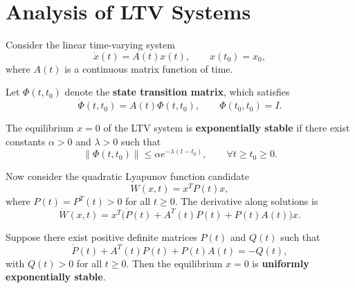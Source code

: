 \section{Analysis of LTV Systems}

Consider the linear time-varying system
\begin{equation}
\dot{x}(t) = A(t)x(t), \qquad x(t_0)=x_0,
\end{equation}
where $A(t)$ is a continuous matrix function of time.

Let $\Phi(t,t_0)$ denote the \textbf{state transition matrix}, which satisfies
\begin{equation}
\dot{\Phi}(t,t_0) = A(t)\Phi(t,t_0), 
\qquad \Phi(t_0,t_0) = I.
\end{equation}

\begin{theorem}
The equilibrium $x=0$ of the LTV system is \textbf{exponentially stable} if there exist constants $\alpha>0$ and $\lambda>0$ such that
\begin{equation}
\|\Phi(t,t_0)\| \le \alpha e^{-\lambda (t-t_0)}, 
\qquad \forall t\ge t_0\ge 0.
\end{equation}
\end{theorem}

Now consider the quadratic Lyapunov function candidate
\begin{equation}
W(x,t) = x^T P(t) x,
\end{equation}
where $P(t)=P^T(t)>0$ for all $t\ge 0$.  
The derivative along solutions is
\begin{equation}
\dot{W}(x,t) = x^T \big( \dot{P}(t) + A^T(t)P(t) + P(t)A(t) \big) x.
\end{equation}

\begin{theorem}
Suppose there exist positive definite matrices $P(t)$ and $Q(t)$ such that
\begin{equation}
\dot{P}(t) + A^T(t)P(t) + P(t)A(t) = -Q(t),
\end{equation}
with $Q(t)>0$ for all $t\ge 0$.  
Then the equilibrium $x=0$ is \textbf{uniformly exponentially stable}.
\end{theorem}

